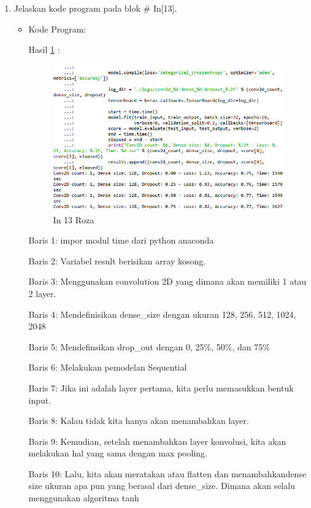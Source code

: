 \begin{enumerate}
\item Jelaskan kode program pada blok \# In[13].
\begin{itemize}
\item Kode Program:

\par Hasil \ref{in13roza} :
\begin{figure}[!hbtp]
\centering
\includegraphics[scale=0.7]{figures/prak13roza.png}
\caption{In 13 Roza}
\label{in13roza}
\end{figure}
\par Baris 1: impor modul time dari python anaconda
\par Baris 2: Variabel result berisikan array kosong.
\par Baris 3: Menggunakan convolution 2D yang dimana akan memiliki 1 atau 2 layer.
\par Baris 4: Mendefinisikan dense\_size dengan ukuran 128, 256, 512, 1024, 2048
\par Baris 5: Mendefinsikan drop\_out dengan 0, 25\%, 50\%, dan 75\%
\par Baris 6:  Melakukan pemodelan Sequential
\par Baris 7: Jika ini adalah layer pertama, kita perlu memasukkan bentuk input.
\par Baris 8: Kalau tidak kita hanya akan menambahkan layer.
\par Baris 9: Kemudian, setelah menambahkan layer konvolusi, kita akan melakukan hal yang sama dengan max pooling.
\par Baris 10: Lalu, kita akan meratakan atau flatten dan menambahkandense size ukuran apa pun yang berasal dari dense\_size. Dimana akan selalu menggunakan algoritma tanh

\end{itemize}
\end{enumerate}
